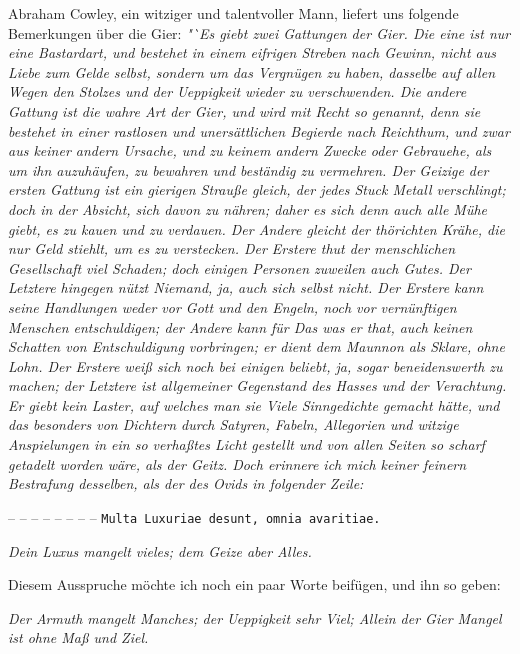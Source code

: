 Abraham Cowley, ein witziger und talentvoller
Mann, liefert uns folgende
Bemerkungen über die Gier:
\textit{"`Es giebt zwei Gattungen der Gier. Die eine ist
nur eine Bastardart, und bestehet in einem eifrigen Streben nach Gewinn, nicht
aus Liebe zum Gelde selbst, sondern um das Vergnügen zu haben, dasselbe auf
allen Wegen den Stolzes und der Ueppigkeit wieder zu verschwenden. Die andere
Gattung ist die wahre Art der Gier, und wird mit Recht so genannt, denn sie
bestehet in einer rastlosen und unersättlichen Begierde nach Reichthum, und zwar
aus keiner andern Ursache, und zu keinem andern Zwecke oder Gebrauehe, als um
ihn auzuhäufen, zu bewahren und beständig zu vermehren. Der Geizige der ersten
Gattung ist ein gierigen Strauße gleich, der jedes Stuck Metall verschlingt;
doch in der Absicht, sich davon zu nähren; daher es sich denn auch alle Mühe
giebt, es zu kauen und zu verdauen. Der Andere gleicht der thörichten Krähe, die
nur Geld stiehlt, um es zu verstecken.  Der
Erstere thut der menschlichen
Gesellschaft viel Schaden; doch einigen Personen zuweilen auch Gutes. Der
Letztere hingegen nützt Niemand, ja, auch sich selbst nicht. Der Erstere kann
seine Handlungen weder vor Gott und den Engeln, noch vor
vernünftigen Menschen
entschuldigen; der Andere kann für Das was er that, auch keinen Schatten von
Entschuldigung vorbringen; er dient dem Maunnon als Sklare, ohne Lohn. Der
Erstere weiß sich noch bei einigen beliebt, ja, sogar beneidenswerth zu machen;
der Letztere ist allgemeiner Gegenstand des Hasses und der Verachtung. Er giebt
kein Laster, auf welches man sie Viele Sinngedichte gemacht hätte, und das
besonders von Dichtern durch Satyren, Fabeln, Allegorien und witzige
Anspielungen in ein so verhaßtes Licht gestellt und von allen Seiten so scharf
getadelt worden wäre, als der Geitz. Doch erinnere ich mich keiner feinern
Bestrafung desselben, als der des Ovids
in folgender Zeile:}

\medskip


– – – – – – – – \texttt{Multa
Luxuriae desunt, omnia avaritiae.}

\textit{Dein Luxus mangelt vieles; dem Geize aber Alles.}

Diesem Ausspruche möchte ich noch ein paar Worte beifügen, und ihn so geben:

\textit{Der Armuth mangelt Manches; der Ueppigkeit sehr Viel;
Allein der Gier Mangel ist ohne Maß und Ziel.}


